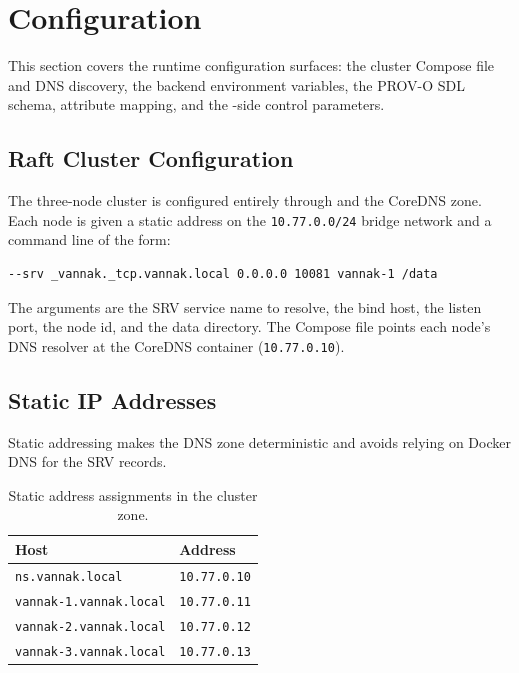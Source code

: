 \section{Configuration}
\label{sec:configuration}

This section covers the runtime configuration surfaces: the \raft{} cluster
Compose file and DNS discovery, the \ipto{} backend environment variables, the
PROV-O SDL schema, attribute mapping, and the \raft{}-side control parameters.

\subsection{Raft Cluster Configuration}

The three-node cluster is configured entirely through
 and the CoreDNS zone. Each node is given a
static address on the \texttt{10.77.0.0/24} bridge network and a command line of
the form:

\begin{lstlisting}[numbers=none]
--srv _vannak._tcp.vannak.local 0.0.0.0 10081 vannak-1 /data
\end{lstlisting}

The arguments are the SRV service name to resolve, the bind host, the listen
port, the node id, and the data directory. The Compose file points each node's
DNS resolver at the CoreDNS container (\texttt{10.77.0.10}).

\subsection{Static IP Addresses}

Static addressing makes the DNS zone deterministic and avoids relying on Docker
DNS for the SRV records.

\begin{table}[htbp]
\centering
\begin{tabular}{ll}
\hline
Host & Address \\
\hline
\texttt{ns.vannak.local} & \texttt{10.77.0.10} \\
\texttt{vannak-1.vannak.local} & \texttt{10.77.0.11} \\
\texttt{vannak-2.vannak.local} & \texttt{10.77.0.12} \\
\texttt{vannak-3.vannak.local} & \texttt{10.77.0.13} \\
\hline
\end{tabular}
\caption{Static address assignments in the cluster zone.}
\end{table}

